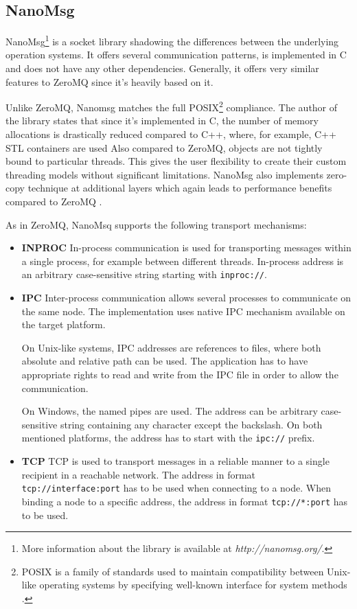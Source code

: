 \subsection{NanoMsg}
\label{nanomsg}
NanoMsg\footnote{More information about the library is available at \textit{http://nanomsg.org/}.} is a socket library shadowing the differences between the underlying operation systems. It offers several communication patterns, is implemented in C and does not have any other dependencies. Generally, it offers very similar features to ZeroMQ since it's heavily based on it.

Unlike ZeroMQ, Nanomsg matches the full POSIX\footnote{POSIX is a family of standards used to maintain compatibility between Unix-like operating systems by specifying well-known interface for system methods \cite{POSIX}. } compliance. The author of the library states that since it's implemented in C, the number of memory allocations is drastically reduced compared to C++, where, for example, C++ STL containers are used  Also compared to ZeroMQ, objects are not tightly bound to particular threads. This gives the user flexibility to create their custom threading models without significant limitations. NanoMsg also implements zero-copy technique at additional layers which again leads to performance benefits compared to ZeroMQ \cite{Nanomsg_Diff}.

As in ZeroMQ, NanoMsq supports the following transport mechanisms:
\begin{itemize}
	\item \textbf{INPROC} \newline
	In-process communication is used for transporting messages within a single process, for example between different threads. In-process address is an arbitrary case-sensitive string starting with \texttt{inproc://}.
	\item \textbf{IPC}  \newline 
	Inter-process communication allows several processes to communicate on the same node. The implementation uses native IPC mechanism available on the target platform. 
	
	On Unix-like systems, IPC addresses are references to files, where both absolute and relative path can be used. The application has to have appropriate rights to read and write from the IPC file in order to allow the communication.
	
	 On Windows, the named pipes are used. The address can be arbitrary case-sensitive string containing any character except the backslash. On both mentioned platforms, the address has to start with the \texttt{ipc://} prefix.
	\item \textbf{TCP} \newline
	TCP is used to transport messages in a reliable manner to a single recipient in a reachable network. The address in format \texttt{tcp://interface:port} has to be used when connecting to a node. When binding a node to a specific address, the address in format \texttt{tcp://*:port} has to be used.
\end{itemize}

